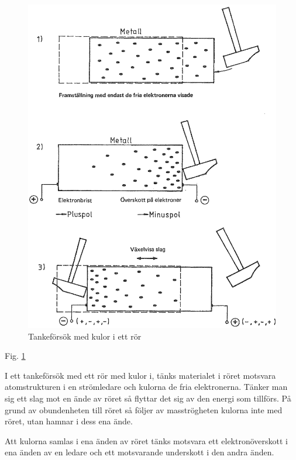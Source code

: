 \begin{figure}
\begin{center}
\includegraphics[width=\textwidth]{images/cropped_pdfs/bild_2_1-02.pdf}
\caption{Tankeförsök med kulor i ett rör}
\label{fig:BildII1-2}
\end{center}
\end{figure}

Fig. \ref{fig:BildII1-2}

I ett tankeförsök med ett rör med kulor i, tänks materialet i röret motsvara
atomstrukturen i en strömledare och kulorna de fria elektronerna. Tänker man
sig ett slag mot en ände av röret så flyttar det sig av den energi som
tillförs. På grund av obundenheten till röret så följer av masströgheten
kulorna inte med röret, utan hamnar i dess ena ände.

Att kulorna samlas i ena änden av röret tänks motsvara ett elektronöverskott i
ena änden av en ledare och ett motsvarande underskott i den andra änden.

